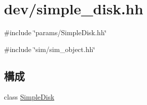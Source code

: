 \hypertarget{simple__disk_8hh}{
\section{dev/simple\_\-disk.hh}
\label{simple__disk_8hh}
}
{\ttfamily \#include \char`\"{}params/SimpleDisk.hh\char`\"{}}\par
{\ttfamily \#include \char`\"{}sim/sim\_\-object.hh\char`\"{}}\par
\subsection*{構成}
\begin{DoxyCompactItemize}
\item 
class \hyperlink{classSimpleDisk}{SimpleDisk}
\end{DoxyCompactItemize}
